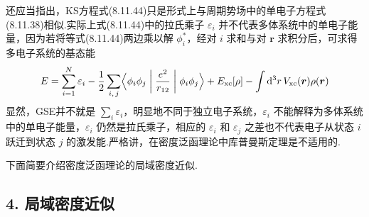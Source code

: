 还应当指出，KS方程式(8.11.44)只是形式上与周期势场中的单电子方程式(8.11.38)相似.实际上式(8.11.44)中的拉氏乘子 $\varepsilon_{i}$ 并不代表多体系统中的单电子能量，因为若将等式(8.11.44)两边乘以解 $\phi_{i}^{*}$，经对 $i$ 求和与对 $\boldsymbol{r}$ 求积分后，可求得多电子系统的基态能
\begin{equation}
  E=\sum_{i=1}^{N}\varepsilon_{i}
  -\frac{1}{2}\sum_{i,\,j}\Bigl\langle\phi_{i}\phi_{j}\biggm|\frac{e^{2}}{r_{12}}\biggm|\phi_{i}\phi_{j}\Bigr\rangle
  +E_{\mathrm{xc}}[\rho]-\int\mathrm{d}^{3}r\,V_{\mathrm{xc}}(\boldsymbol{r})\rho(\boldsymbol{r})
\end{equation}
显然，GSE并不就是 $\sum_{i}\varepsilon_{i}$，明显地不同于独立电子系统，$\varepsilon_{i}$ 不能解释为多体系统中的单电子能量，$\varepsilon_{i}$ 仍然是拉氏乘子，相应的 $\varepsilon_{i}$ 和 $\varepsilon_{j}$ 之差也不代表电子从状态 $i$ 跃迁到状态 $j$ 的激发能.严格讲，在密度泛函理论中库普曼斯定理是不适用的.

下面简要介绍密度泛函理论的局域密度近似.

\subsection*{4. 局域密度近似}

